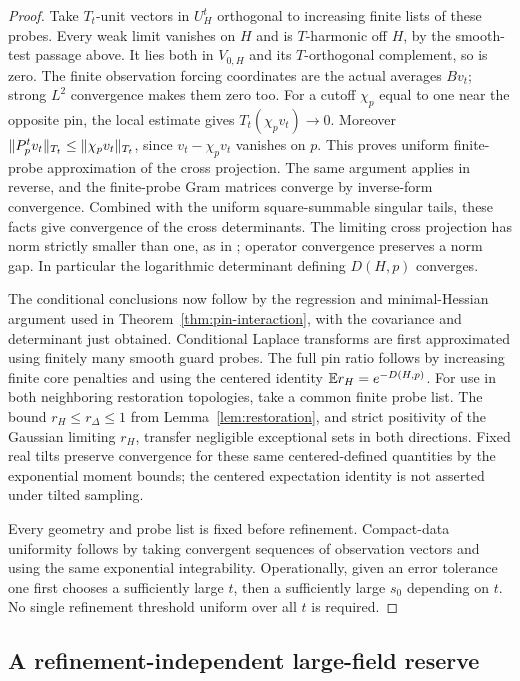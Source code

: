 \begin{proof}
Take \(T_t\)-unit vectors in \(U_H^t\) orthogonal to increasing
finite lists of these probes.  Every weak limit vanishes on
\(H\) and is \(T\)-harmonic off \(H\), by the smooth-test
passage above.  It lies both in \(V_{0,H}\) and its
\(T\)-orthogonal complement, so is zero.  The finite
observation forcing coordinates are the actual averages
\(Bv_t\); strong \(L^2\) convergence makes them zero too.
For a cutoff \(\chi_p\) equal to one near the opposite pin,
the local estimate gives \(T_t(\chi_pv_t)\to0\).
Moreover
\(\lVert P_p^tv_t\rVert_{T_t}\leq\lVert \chi_pv_t\rVert_{T_t}\),
since \(v_t-\chi_pv_t\) vanishes on \(p\).  This proves
uniform finite-probe approximation of the cross projection.
The same argument applies in reverse, and the finite-probe
Gram matrices converge by inverse-form convergence.
Combined with the uniform square-summable singular tails,
these facts give convergence of the cross determinants.
The limiting cross projection has norm strictly smaller than
one, as in ; operator convergence
preserves a norm gap.  In particular the logarithmic determinant
defining \(D(H,p)\) converges.

The conditional conclusions now follow by the regression and
minimal-Hessian argument used in Theorem~\ref{thm:pin-interaction},
with the covariance and determinant just obtained.  Conditional
Laplace transforms are first approximated using finitely many
smooth guard probes.  The full pin ratio follows by increasing
finite core penalties and using the centered identity
\(\mathbb E r_H=e^{-D(H,p)}\).
For use in both neighboring restoration topologies, take a
common finite probe list.  The bound
\(r_H\leq r_\Delta\leq1\) from Lemma~\ref{lem:restoration}, and
strict positivity of the Gaussian limiting \(r_H\), transfer
negligible exceptional sets in both directions.  Fixed real
tilts preserve convergence for these same centered-defined
quantities by the exponential moment bounds; the centered
expectation identity is not asserted under tilted sampling.

Every geometry and probe list is fixed before refinement.
Compact-data uniformity follows by taking convergent sequences
of observation vectors and using the same exponential
integrability.  Operationally, given an error tolerance one
first chooses a sufficiently large \(t\), then a sufficiently
large \(s_0\) depending on \(t\).  No single refinement threshold
uniform over all \(t\) is required.
\end{proof}

\subsection{A refinement-independent large-field reserve}


